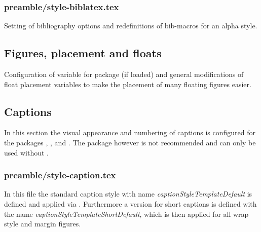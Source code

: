 
\subsubsection{preamble/style-biblatex.tex}

Setting of bibliography options and redefinitions of bib-macros for an alpha style.


\subsection{Figures, placement and floats}

Configuration of variable for package  (if loaded) and 
general modifications of float placement variables to make the placement of 
many floating figures easier.


\subsection{Captions}

In this section the visual appearance and numbering of captions is configured 
for the packages , , 
 and . 
The package  however is not 
recommended and can only be used without .


\subsubsection{preamble/style-caption.tex}

In this file the standard caption style with name \emph{captionStyleTemplateDefault} is defined and applied via . Furthermore a version for short captions is defined with the name \emph{captionStyleTemplateShortDefault}, which is then applied for all wrap style and margin figures.

